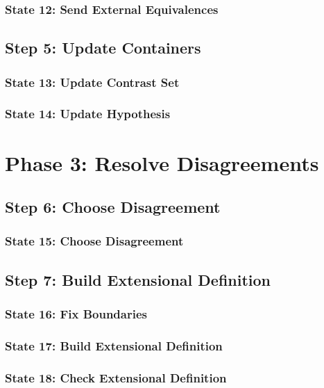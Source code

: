 \subsubsection{State 12: Send External Equivalences}

\subsection{Step 5: Update Containers}

\subsubsection{State 13: Update Contrast Set}

\subsubsection{State 14: Update Hypothesis}

\section{Phase 3: Resolve Disagreements}

\subsection{Step 6: Choose Disagreement}

\subsubsection{State 15: Choose Disagreement}

\subsection{Step 7: Build Extensional Definition}

\subsubsection{State 16: Fix Boundaries}

\subsubsection{State 17: Build Extensional Definition}

\subsubsection{State 18: Check Extensional Definition}

